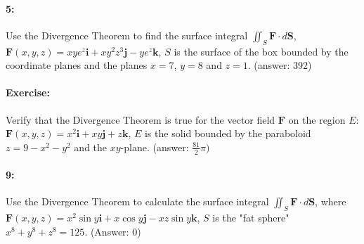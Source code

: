 \documentclass[10pt,letter]{article}
\newcommand{\F}{\mathbf{F}}
\renewcommand{\i}{\mathbf{i}}
\renewcommand{\j}{\mathbf{j}}
\renewcommand{\k}{\mathbf{k}}
\begin{document}
\paragraph{5:} Use the Divergence Theorem to find the surface integral $\iint_S\F\cdot d\mathbf{S}$, $\F(x,y,z)=xye^z\i+xy^2z^3\j-ye^z\k$, $S$ is the surface of the box bounded by the coordinate planes and the planes $x=7$, $y=8$ and $z=1$. (answer: 392)
\paragraph{Exercise:} Verify that the Divergence Theorem is true for the vector field $\F$ on the region $E$: $\F(x,y,z)=x^2\i+xy\j+z\k$, $E$ is the solid bounded by the paraboloid $z=9-x^2-y^2$ and the $xy$-plane. (answer: $\frac{81}{2}\pi)$
\paragraph{9:} Use the Divergence Theorem to calculate the surface integral $\iint_S\F\cdot d\mathbf{S}$, where $\F(x,y,z)=x^2\sin y\i+x\cos y\j-xz\sin y \k$, $S$ is the "fat sphere" $x^8+y^8+z^8=125$. (Answer: 0)
\end{document}
